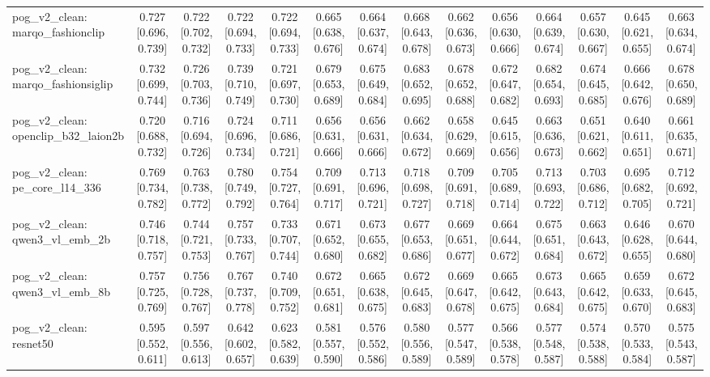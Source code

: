 \begin{table}[t]
\begin{tabular}{lccccccccccccc}
pog\_v2\_clean: marqo\_fashionclip & 0.727 [0.696, 0.739] & 0.722 [0.702, 0.732] & 0.722 [0.694, 0.733] & 0.722 [0.694, 0.733] & 0.665 [0.638, 0.676] & 0.664 [0.637, 0.674] & 0.668 [0.643, 0.678] & 0.662 [0.636, 0.673] & 0.656 [0.630, 0.666] & 0.664 [0.639, 0.674] & 0.657 [0.630, 0.667] & 0.645 [0.621, 0.655] & 0.663 [0.634, 0.674] \\
pog\_v2\_clean: marqo\_fashionsiglip & 0.732 [0.699, 0.744] & 0.726 [0.703, 0.736] & 0.739 [0.710, 0.749] & 0.721 [0.697, 0.730] & 0.679 [0.653, 0.689] & 0.675 [0.649, 0.684] & 0.683 [0.652, 0.695] & 0.678 [0.652, 0.688] & 0.672 [0.647, 0.682] & 0.682 [0.654, 0.693] & 0.674 [0.645, 0.685] & 0.666 [0.642, 0.676] & 0.678 [0.650, 0.689] \\
pog\_v2\_clean: openclip\_b32\_laion2b & 0.720 [0.688, 0.732] & 0.716 [0.694, 0.726] & 0.724 [0.696, 0.734] & 0.711 [0.686, 0.721] & 0.656 [0.631, 0.666] & 0.656 [0.631, 0.666] & 0.662 [0.634, 0.672] & 0.658 [0.629, 0.669] & 0.645 [0.615, 0.656] & 0.663 [0.636, 0.673] & 0.651 [0.621, 0.662] & 0.640 [0.611, 0.651] & 0.661 [0.635, 0.671] \\
pog\_v2\_clean: pe\_core\_l14\_336 & 0.769 [0.734, 0.782] & 0.763 [0.738, 0.772] & 0.780 [0.749, 0.792] & 0.754 [0.727, 0.764] & 0.709 [0.691, 0.717] & 0.713 [0.696, 0.721] & 0.718 [0.698, 0.727] & 0.709 [0.691, 0.718] & 0.705 [0.689, 0.714] & 0.713 [0.693, 0.722] & 0.703 [0.686, 0.712] & 0.695 [0.682, 0.705] & 0.712 [0.692, 0.721] \\
pog\_v2\_clean: qwen3\_vl\_emb\_2b & 0.746 [0.718, 0.757] & 0.744 [0.721, 0.753] & 0.757 [0.733, 0.767] & 0.733 [0.707, 0.744] & 0.671 [0.652, 0.680] & 0.673 [0.655, 0.682] & 0.677 [0.653, 0.686] & 0.669 [0.651, 0.677] & 0.664 [0.644, 0.672] & 0.675 [0.651, 0.684] & 0.663 [0.643, 0.672] & 0.646 [0.628, 0.655] & 0.670 [0.644, 0.680] \\
pog\_v2\_clean: qwen3\_vl\_emb\_8b & 0.757 [0.725, 0.769] & 0.756 [0.728, 0.767] & 0.767 [0.737, 0.778] & 0.740 [0.709, 0.752] & 0.672 [0.651, 0.681] & 0.665 [0.638, 0.675] & 0.672 [0.645, 0.683] & 0.669 [0.647, 0.678] & 0.665 [0.642, 0.675] & 0.673 [0.643, 0.684] & 0.665 [0.642, 0.675] & 0.659 [0.633, 0.670] & 0.672 [0.645, 0.683] \\
pog\_v2\_clean: resnet50 & 0.595 [0.552, 0.611] & 0.597 [0.556, 0.613] & 0.642 [0.602, 0.657] & 0.623 [0.582, 0.639] & 0.581 [0.557, 0.590] & 0.576 [0.552, 0.586] & 0.580 [0.556, 0.589] & 0.577 [0.547, 0.589] & 0.566 [0.538, 0.578] & 0.577 [0.548, 0.587] & 0.574 [0.538, 0.588] & 0.570 [0.533, 0.584] & 0.575 [0.543, 0.587] \\

\end{tabular}
\end{table}
